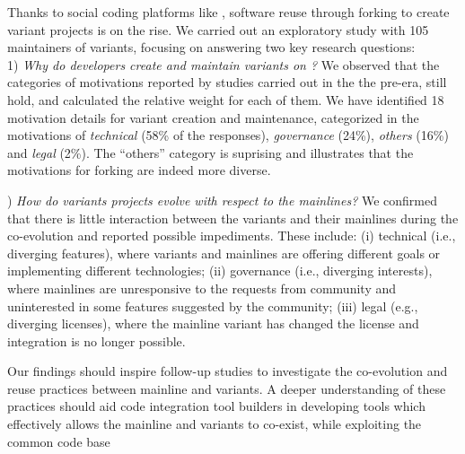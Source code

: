 Thanks to social coding platforms like \gh, software reuse through forking to create variant projects is on the rise.
We carried out an exploratory study with 105 maintainers of variants, focusing on answering two key research questions:\\
1) \textit{Why do developers create and maintain variants on \gh?}
We observed that the categories of motivations reported by studies carried out in the the pre-\gh era, still hold, and calculated the relative weight for each of them. We have identified 18 motivation details  for variant creation and maintenance, categorized in the motivations of \emph{technical} (58\% of the responses), \emph{governance} (24\%), \emph{others} (16\%) and \emph{legal} (2\%).
The ``others'' category is suprising and illustrates that the motivations for forking are indeed more diverse. 

) \textit{How do variants projects evolve with respect to the mainlines?}
We confirmed that there is little interaction between the variants and their mainlines during the co-evolution and reported possible impediments. These include: (i) technical (i.e., diverging features), where variants and mainlines are offering different goals or implementing different technologies; (ii) governance (i.e., diverging interests), where mainlines are unresponsive to the requests from community and uninterested in some features suggested by the community; (iii) legal (e.g., diverging licenses), where the mainline variant has changed the license and integration is no longer possible.

Our findings should inspire follow-up studies to investigate the co-evolution and reuse practices between mainline and variants. A deeper understanding of these practices should aid code integration tool builders in developing tools which effectively allows the mainline and variants to co-exist, while exploiting the common code base


